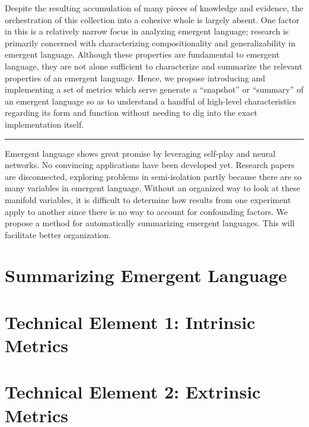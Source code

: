 
Despite the resulting accumulation of many pieces of knowledge and evidence, the orchestration of this collection into a cohesive whole is largely absent.
One factor in this is a relatively narrow focus in analyzing emergent language; research is primarily concerned with characterizing compositionality and generalizability in emergent language.
Although these properties are fundamental to emergent language, they are not alone sufficient to characterize and summarize the relevant properties of an emergent language.
Hence, we propose introducing and implementing a set of metrics which serve generate a ``snapshot'' or ``summary'' of an emergent language so as to understand a handful of high-level characteristics regarding its form and function without needing to dig into the exact implementation itself.


\vspace{0.2in} \hrule \vspace{0.2in}

Emergent language shows great promise by leveraging self-play and neural networks.
No convincing applications have been developed yet.
Research papers are disconnected, exploring problems in semi-isolation partly because there are so many variables in emergent language.
Without an organized way to look at these manifold variables, it is difficult to determine how results from one experiment apply to another since there is no way to account for confounding factors.
We propose a method for automatically summarizing emergent languages.
This will facilitate better organization.

\section{Summarizing Emergent Language}

\section{Technical Element 1: Intrinsic Metrics}
\section{Technical Element 2: Extrinsic Metrics}
